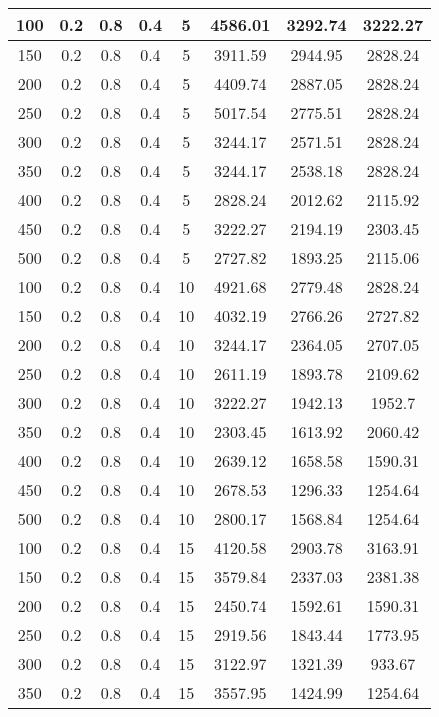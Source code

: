 \documentclass[a4paper, 12pt]{extreport}
\begin{document}
\begin{itemize}
\begin{longtable}{|c|c|c|c|c|c|c|c|}
			100 & 0.2 & 0.8 & 0.4 & 5 & 4586.01 & 3292.74 & 3222.27 \\\hline
			150 & 0.2 & 0.8 & 0.4 & 5 & 3911.59 & 2944.95 & 2828.24 \\\hline
			200 & 0.2 & 0.8 & 0.4 & 5 & 4409.74 & 2887.05 & 2828.24 \\\hline
			250 & 0.2 & 0.8 & 0.4 & 5 & 5017.54 & 2775.51 & 2828.24 \\\hline
			300 & 0.2 & 0.8 & 0.4 & 5 & 3244.17 & 2571.51 & 2828.24 \\\hline
			350 & 0.2 & 0.8 & 0.4 & 5 & 3244.17 & 2538.18 & 2828.24 \\\hline
			400 & 0.2 & 0.8 & 0.4 & 5 & 2828.24 & 2012.62 & 2115.92 \\\hline
			450 & 0.2 & 0.8 & 0.4 & 5 & 3222.27 & 2194.19 & 2303.45 \\\hline
			500 & 0.2 & 0.8 & 0.4 & 5 & 2727.82 & 1893.25 & 2115.06 \\\hline
			100 & 0.2 & 0.8 & 0.4 & 10 & 4921.68 & 2779.48 & 2828.24 \\\hline
			150 & 0.2 & 0.8 & 0.4 & 10 & 4032.19 & 2766.26 & 2727.82 \\\hline
			200 & 0.2 & 0.8 & 0.4 & 10 & 3244.17 & 2364.05 & 2707.05 \\\hline
			250 & 0.2 & 0.8 & 0.4 & 10 & 2611.19 & 1893.78 & 2109.62 \\\hline
			300 & 0.2 & 0.8 & 0.4 & 10 & 3222.27 & 1942.13 & 1952.7 \\\hline
			350 & 0.2 & 0.8 & 0.4 & 10 & 2303.45 & 1613.92 & 2060.42 \\\hline
			400 & 0.2 & 0.8 & 0.4 & 10 & 2639.12 & 1658.58 & 1590.31 \\\hline
			450 & 0.2 & 0.8 & 0.4 & 10 & 2678.53 & 1296.33 & 1254.64 \\\hline
			500 & 0.2 & 0.8 & 0.4 & 10 & 2800.17 & 1568.84 & 1254.64 \\\hline
			100 & 0.2 & 0.8 & 0.4 & 15 & 4120.58 & 2903.78 & 3163.91 \\\hline
			150 & 0.2 & 0.8 & 0.4 & 15 & 3579.84 & 2337.03 & 2381.38 \\\hline
			200 & 0.2 & 0.8 & 0.4 & 15 & 2450.74 & 1592.61 & 1590.31 \\\hline
			250 & 0.2 & 0.8 & 0.4 & 15 & 2919.56 & 1843.44 & 1773.95 \\\hline
			300 & 0.2 & 0.8 & 0.4 & 15 & 3122.97 & 1321.39 & 933.67 \\\hline
			350 & 0.2 & 0.8 & 0.4 & 15 & 3557.95 & 1424.99 & 1254.64 \\\hline

\end{longtable}
\end{itemize}
\end{document}
